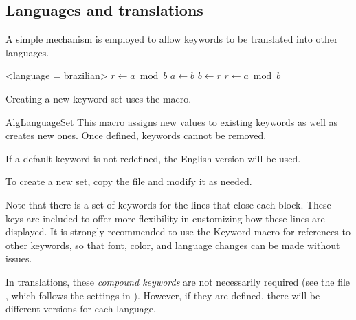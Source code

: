 \documentclass[a4paper, 11pt]{article}
\begin{document}
\begin{comment}
    parameter indent = 0pt,
\end{comment}

\subsection{Languages and translations}\label{sec:languages-and-translations}
%
A simple mechanism is employed to allow keywords to be translated into other languages.

\begingroup
\begin{PDExample}
    \begin{algorithmic}
        <language = brazilian>
            \State $r\gets a\bmod b$
                \State $a\gets b$
                \State $b\gets r$
                \State $r\gets a\bmod b$
            \EndWhile
        \EndProcedure
    \end{algorithmic}
\end{PDExample}
\endgroup


Creating a new keyword set uses the  macro.

\begin{Macrodef}{AlgLanguageSet}{}{}
    This macro assigns new values to existing keywords as well as creates new ones. Once defined, keywords cannot be removed.


    If a default keyword is not redefined, the English version will be used.


    To create a new set, copy the file  and modify it as needed.


    Note that there is a set of keywords for the lines that close each block. These keys are included to offer more flexibility in customizing how these lines are displayed. It is strongly recommended to use the {Keyword} macro for references to other keywords, so that font, color, and language changes can be made without issues.


    In translations, these \textit{compound keywords} are not necessarily required (see the file , which follows the settings in ). However, if they are defined, there will be different versions for each language.
\end{Macrodef}
\end{document}

